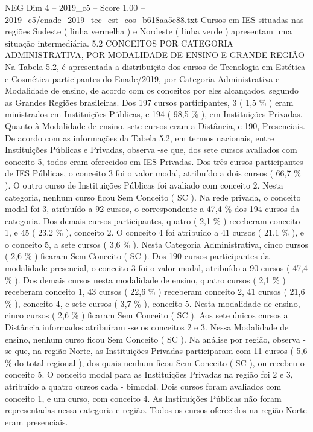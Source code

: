 \begin{textsample}{NEG Dim 4 – 2019\_c5 – Score 1.00 – 2019\_c5/enade\_2019\_tec\_est\_cos\_b618aa5e88.txt}
Cursos em IES situadas nas regiões Sudeste ( linha vermelha ) e Nordeste ( linha verde ) apresentam uma situação intermediária. 5.2 CONCEITOS POR CATEGORIA ADMINISTRATIVA, POR MODALIDADE DE ENSINO E GRANDE REGIÃO Na Tabela 5.2, é apresentada a distribuição dos cursos de Tecnologia em Estética e Cosmética participantes do Enade/2019, por Categoria Administrativa e Modalidade de ensino, de acordo com os conceitos por eles alcançados, segundo as Grandes Regiões brasileiras.
Dos 197 cursos participantes, 3 ( 1,5 \% ) eram ministrados em Instituições Públicas, e 194 ( 98,5 \% ), em Instituições Privadas.
Quanto à Modalidade de ensino, sete cursos eram a Distância, e 190, Presenciais.
De acordo com as informações da Tabela 5.2, em termos nacionais, entre Instituições Públicas e Privadas, observa -se que, dos sete cursos avaliados com conceito 5, todos eram oferecidos em IES Privadas.
Dos três cursos participantes de IES Públicas, o conceito 3 foi o valor modal, atribuído a dois cursos ( 66,7 \% ).
O outro curso de Instituições Públicas foi avaliado com conceito 2.
Nesta categoria, nenhum curso ficou Sem Conceito ( SC ).
Na rede privada, o conceito modal foi 3, atribuído a 92 cursos, o correspondente a 47,4 \% dos 194 cursos da categoria.
Dos demais cursos participantes, quatro ( 2,1 \% ) receberam conceito 1, e 45 ( 23,2 \% ), conceito 2.
O conceito 4 foi atribuído a 41 cursos ( 21,1 \% ), e o conceito 5, a sete cursos ( 3,6 \% ).
Nesta Categoria Administrativa, cinco cursos ( 2,6 \% ) ficaram Sem Conceito ( SC ).
Dos 190 cursos participantes da modalidade presencial, o conceito 3 foi o valor modal, atribuído a 90 cursos ( 47,4 \% ).
Dos demais cursos nesta modalidade de ensino, quatro cursos ( 2,1 \% ) receberam conceito 1, 43 cursos ( 22,6 \% ) receberam conceito 2, 41 cursos ( 21,6 \% ), conceito 4, e sete cursos ( 3,7 \% ), conceito 5.
Nesta modalidade de ensino, cinco cursos ( 2,6 \% ) ficaram Sem Conceito ( SC ).
Aos sete únicos cursos a Distância informados atribuíram -se os conceitos 2 e 3.
Nessa Modalidade de ensino, nenhum curso ficou Sem Conceito ( SC ).
Na análise por região, observa -se que, na região Norte, as Instituições Privadas participaram com 11 cursos ( 5,6 \% do total regional ), dos quais nenhum ficou Sem Conceito ( SC ), ou recebeu o conceito 5.
O conceito modal para as Instituições Privadas na região foi 2 e 3, atribuído a quatro cursos cada - bimodal.
Dois cursos foram avaliados com conceito 1, e um curso, com conceito 4.
As Instituições Públicas não foram representadas nessa categoria e região.
Todos os cursos oferecidos na região Norte eram presenciais.

\end{textsample}

